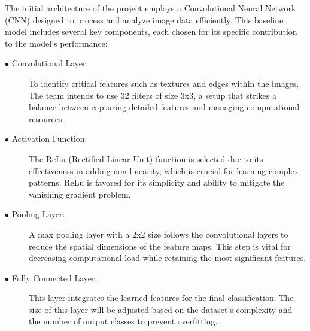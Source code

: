 \documentclass{article} %
\begin{document}
The initial architecture of the project employs a Convolutional Neural Network (CNN) designed to process and analyze image data efficiently. This baseline model includes several key components, each chosen for its specific contribution to the model's performance:
\begin{description}
  \item[$\bullet$ Convolutional Layer:]  To identify critical features such as textures and edges within the images. The team intends to use 32 filters of size 3x3, a setup that strikes a balance between capturing detailed features and managing computational resources.
  \item[$\bullet$ Activation Function:] The ReLu (Rectified Linear Unit) function is selected due to its effectiveness in adding non-linearity, which is crucial for learning complex patterns. ReLu is favored for its simplicity and ability to mitigate the vanishing gradient problem.
  \item[$\bullet$ Pooling Layer:] A max pooling layer with a 2x2 size follows the convolutional layers to reduce the spatial dimensions of the feature maps. This step is vital for decreasing computational load while retaining the most significant features.
  \item[$\bullet$ Fully Connected Layer: ] This layer integrates the learned features for the final classification. The size of this layer will be adjusted based on the dataset's complexity and the number of output classes to prevent overfitting.
\end{description}
\end{document}
